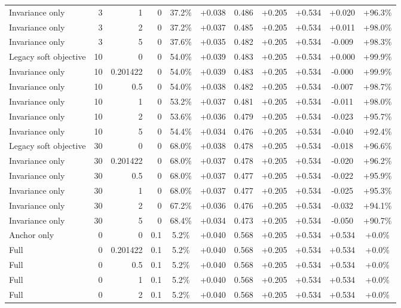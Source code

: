 \begin{table}[htbp]
\begin{tabular}{lrrrccccccc}
Invariance only & 3 & 1 & 0 & 37.2\% & +0.038 & 0.486 & +0.205 & +0.534 & +0.020 & +96.3\% \\
Invariance only & 3 & 2 & 0 & 37.2\% & +0.037 & 0.485 & +0.205 & +0.534 & +0.011 & +98.0\% \\
Invariance only & 3 & 5 & 0 & 37.6\% & +0.035 & 0.482 & +0.205 & +0.534 & -0.009 & +98.3\% \\
Legacy soft objective & 10 & 0 & 0 & 54.0\% & +0.039 & 0.483 & +0.205 & +0.534 & +0.000 & +99.9\% \\
Invariance only & 10 & 0.201422 & 0 & 54.0\% & +0.039 & 0.483 & +0.205 & +0.534 & -0.000 & +99.9\% \\
Invariance only & 10 & 0.5 & 0 & 54.0\% & +0.038 & 0.482 & +0.205 & +0.534 & -0.007 & +98.7\% \\
Invariance only & 10 & 1 & 0 & 53.2\% & +0.037 & 0.481 & +0.205 & +0.534 & -0.011 & +98.0\% \\
Invariance only & 10 & 2 & 0 & 53.6\% & +0.036 & 0.479 & +0.205 & +0.534 & -0.023 & +95.7\% \\
Invariance only & 10 & 5 & 0 & 54.4\% & +0.034 & 0.476 & +0.205 & +0.534 & -0.040 & +92.4\% \\
Legacy soft objective & 30 & 0 & 0 & 68.0\% & +0.038 & 0.478 & +0.205 & +0.534 & -0.018 & +96.6\% \\
Invariance only & 30 & 0.201422 & 0 & 68.0\% & +0.037 & 0.478 & +0.205 & +0.534 & -0.020 & +96.2\% \\
Invariance only & 30 & 0.5 & 0 & 68.0\% & +0.037 & 0.477 & +0.205 & +0.534 & -0.022 & +95.9\% \\
Invariance only & 30 & 1 & 0 & 68.0\% & +0.037 & 0.477 & +0.205 & +0.534 & -0.025 & +95.3\% \\
Invariance only & 30 & 2 & 0 & 67.2\% & +0.036 & 0.476 & +0.205 & +0.534 & -0.032 & +94.1\% \\
Invariance only & 30 & 5 & 0 & 68.4\% & +0.034 & 0.473 & +0.205 & +0.534 & -0.050 & +90.7\% \\
Anchor only & 0 & 0 & 0.1 & 5.2\% & +0.040 & 0.568 & +0.205 & +0.534 & +0.534 & +0.0\% \\
Full & 0 & 0.201422 & 0.1 & 5.2\% & +0.040 & 0.568 & +0.205 & +0.534 & +0.534 & +0.0\% \\
Full & 0 & 0.5 & 0.1 & 5.2\% & +0.040 & 0.568 & +0.205 & +0.534 & +0.534 & +0.0\% \\
Full & 0 & 1 & 0.1 & 5.2\% & +0.040 & 0.568 & +0.205 & +0.534 & +0.534 & +0.0\% \\
Full & 0 & 2 & 0.1 & 5.2\% & +0.040 & 0.568 & +0.205 & +0.534 & +0.534 & +0.0\% \\

\end{tabular}
\end{table}
